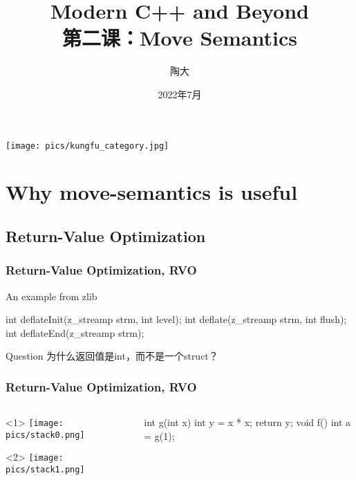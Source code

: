 \documentclass[UTF8,lualatex]{ctexbeamer}
\title{\kaishu Modern C++ and Beyond\\
    第二课：Move Semantics}
\author{陶大}
\date{2022年7月}
\begin{document}
\songti

\begin{frame}[plain]
    \titlepage
\end{frame}

\begin{frame}[plain]
    \begin{center}
        \texttt{[image: pics/kungfu\_category.jpg]}
    \end{center}
\end{frame}

\begin{frame}[plain]
    \tableofcontents
\end{frame}

\section{Why move-semantics is useful}
\subsection{Return-Value Optimization}

\begin{frame}[fragile]
    \frametitle{Return-Value Optimization, RVO}
    \begin{block}{An example from zlib}
        \begin{cppcode}
            int deflateInit(z_streamp strm, int level);
            int deflate(z_streamp strm, int flush);
            int deflateEnd(z_streamp strm);
        \end{cppcode}
    \end{block}
    \begin{alertblock}{Question}
        为什么返回值是int，而不是一个struct？
    \end{alertblock}
\end{frame}

\begin{frame}[fragile]
    \frametitle{Return-Value Optimization, RVO}
    \begin{columns}
        \begin{column}{.45\textwidth}
            \begin{onlyenv}<1>
                \texttt{[image: pics/stack0.png]}
            \end{onlyenv}
            \begin{onlyenv}<2>
                \texttt{[image: pics/stack1.png]}
            \end{onlyenv}
        \end{column}
        \begin{column}{.45\textwidth}
            \begin{cppcode}
                int g(int x) {
                    int y = x * x;
                    return y;
                }
                void f() {
                    int a = g(1);
                }
            \end{cppcode}
        \end{column}
    \end{columns}
\end{frame}
\end{document}
